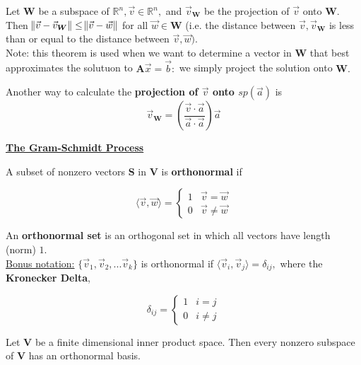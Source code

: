 \documentclass{article}
\begin{document}
\begin{theorem}
Let $\boldsymbol{W}$ be a subspace of $\mathbb{R}^n, \vec{v} \in \mathbb{R}^n,$ and $\vec{v}_{\boldsymbol{W}}$ be the projection of $\vec{v}$ onto $\boldsymbol{W}.$ Then $\norm{\vec{v} - \vec{v}_{\boldsymbol{W}}} \leq \norm{\vec{v} - \vec{w}}$ for all $\vec{w} \in \boldsymbol{W}$ (i.e. the distance between $\vec{v}, \vec{v}_{\boldsymbol{W}}$ is less than or equal to the distance between $\vec{v}, \vec{w}).$ \\

Note: this theorem is used when we want to determine a vector in $\boldsymbol{W}$ that best approximates the solutuon to $\boldsymbol{A}\vec{x} = \vec{b}:$ we simply project the solution onto $\boldsymbol{W}.$
\end{theorem}

\begin{theorem}
Another way to calculate the \textbf{projection of $\vec{v}$ onto $sp(\vec{a})$} is 
\[
    \boxed{\vec{v}_{\boldsymbol{W}} = (\frac{\vec{v} \cdot \vec{a}}{\vec{a} \cdot \vec{a}}) \vec{a}}
\]
\end{theorem}

\newpage

\underline{\textbf{The Gram-Schmidt Process}}
\begin{definition}
A subset of nonzero vectors $\boldsymbol{S}$ in $\boldsymbol{V}$ is \textbf{orthonormal} if 

\[ 
    \langle \vec{v}, \vec{w} \rangle = 
    \begin{cases} 
      1 & \vec{v} = \vec{w} \\
      0 & \vec{v} \neq \vec{w}
   \end{cases}
\]

An \textbf{orthonormal set} is an orthogonal set in which all vectors have length (norm) $1$. \\

\underline{Bonus notation:} $\{\vec{v}_{1}, \vec{v}_{2}, ... \vec{v}_{k}\}$ is orthonormal if $\langle \vec{v}_{i}, \vec{v}_{j} \rangle = \delta_{ij},$ where the \textbf{Kronecker Delta},

\[ 
    \delta_{ij} = 
    \begin{cases} 
      1 & i = j \\
      0 & i \neq j
   \end{cases}
\]

\end{definition}

\begin{theorem}
Let $\boldsymbol{V}$ be a finite dimensional inner product space. Then every nonzero subspace of $\boldsymbol{V}$ has an orthonormal basis.
\end{theorem}
\end{document}
